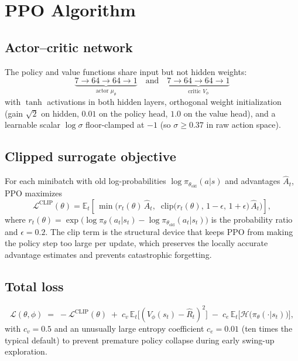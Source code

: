 \documentclass[11pt,a4paper]{article}
\begin{document}
\section{PPO Algorithm}

\subsection{Actor--critic network}
The policy and value functions share input but not hidden weights:
\begin{equation*}
\underbrace{7 \to 64 \to 64 \to 1}_{\text{actor }\mu_\theta} \quad\text{and}\quad
\underbrace{7 \to 64 \to 64 \to 1}_{\text{critic } V_\phi}
\end{equation*}
with $\tanh$ activations in both hidden layers, orthogonal weight initialization
(gain $\sqrt{2}$ on hidden, $0.01$ on the policy head, $1.0$ on the value head),
and a learnable scalar $\log\sigma$ floor-clamped at $-1$ (so $\sigma \geq 0.37$
in raw action space).

\subsection{Clipped surrogate objective}
For each minibatch with old log-probabilities $\log\pi_{\theta_{\text{old}}}(a|s)$ and advantages $\hat A_t$, PPO maximizes
\begin{equation}
\mathcal{L}^{\text{CLIP}}(\theta)
= \mathbb{E}_t\!\left[\,
\min\!\bigl(r_t(\theta)\,\hat A_t,\;\;
            \mathrm{clip}\bigl(r_t(\theta),\,1-\epsilon,\,1+\epsilon\bigr)\,\hat A_t\bigr)
\right],
\end{equation}
where $r_t(\theta) = \exp\bigl(\log\pi_\theta(a_t|s_t) - \log\pi_{\theta_{\text{old}}}(a_t|s_t)\bigr)$ is the probability ratio and $\epsilon = 0.2$. The clip term is the structural device that keeps PPO from making the policy step too large per update, which preserves the locally accurate advantage estimates and prevents catastrophic forgetting.

\subsection{Total loss}
\begin{equation}
\mathcal{L}(\theta,\phi) \;=\; -\mathcal{L}^{\text{CLIP}}(\theta)
\;+\; c_v \,\mathbb{E}_t\bigl[(V_\phi(s_t) - \hat R_t)^2\bigr]
\;-\; c_e\, \mathbb{E}_t\bigl[\mathcal{H}\bigl(\pi_\theta(\cdot|s_t)\bigr)\bigr],
\end{equation}
with $c_v = 0.5$ and an unusually large entropy coefficient $c_e = 0.01$ (ten times the typical default) to prevent premature policy collapse during early swing-up exploration.
\end{document}
